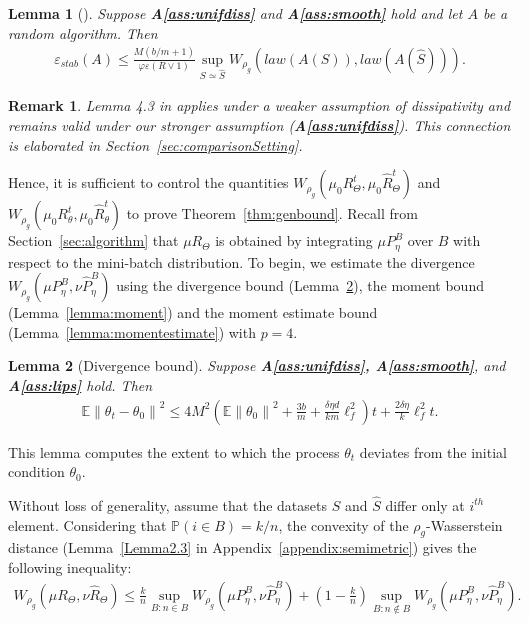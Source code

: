 \documentclass{article}
\newcommand{\norm}[1]{\left\lVert#1\right\rVert} %
\newtheorem{lemma}{Lemma}
\newtheorem{remark}{Remark}
\begin{document}
\begin{lemma}[{\cite[Lemma 4.3]{Farghly}}]\label{Lemmastab}
    Suppose \textbf{A\ref{ass:unifdiss}} and \textbf{A\ref{ass:smooth}} hold and let $A$ be a random algorithm. Then
    \begin{align*}
        \varepsilon_{stab} (A) \!\leq\! \frac{M (b/m \!+\!1)}{\varphi \varepsilon (R \vee 1)} \!\sup_{S \simeq \widehat{S}}\! W_{\rho_g} \!\!\left(law (A(S)), law(A(\widehat{S}))\!\right)\!.\!
    \end{align*}
\end{lemma}

\begin{remark}
    Lemma 4.3 in \citet{Farghly} applies under a weaker assumption of dissipativity and remains valid under our stronger assumption (\textbf{A\ref{ass:unifdiss}}). This connection is elaborated in Section~\ref{sec:comparisonSetting}.
\end{remark}

Hence, it is sufficient to control the quantities $W_{\rho_g}(\mu_0 R_\Theta^t, \mu_0 \widehat{R}_\Theta^t)$ and $W_{\rho_g}(\mu_0 R_\theta^t, \mu_0 \widehat{R}_\theta^t)$ to prove Theorem~\ref{thm:genbound}. Recall from Section~\ref{sec:algorithm} that $\mu R_\Theta$ is obtained by integrating $\mu P_\eta^B$ over $B$ with respect to the mini-batch distribution. To begin, we estimate the divergence $W_{\rho_g} (\mu P_\eta^B, \nu \widehat{P}_\eta^B)$ using the divergence bound (Lemma~\ref{lemma:divergence}), the moment bound (Lemma~\ref{lemma:moment}) and the moment estimate bound (Lemma~\ref{lemma:momentestimate}) with $p=4$.

\label{sec:divergence}
\begin{lemma}[Divergence bound]\label{lemma:divergence}
    Suppose \textbf{A\ref{ass:unifdiss}, A\ref{ass:smooth}}, and \textbf{A\ref{ass:lips}} hold. Then
    \begin{align*}
        \mathbb{E} \norm{\theta_t - \theta_0}^2 \!\leq\! 4M^2 \!\left(\!\mathbb{E}\norm{\theta_0}^2 \!+\!   \frac{3b}{m} \!+\!\frac{\delta \eta d}{k m} \ell_f^2 \!\right)\! t\!+\!\frac{2\delta \eta}{k} \ell_f^2 t.
    \end{align*}
\end{lemma}

This lemma computes the extent to which the process $\theta_t$ deviates from the initial condition $\theta_0$.

Without loss of generality, assume that the datasets $S$ and $\widehat{S}$ differ only at $i^{th}$ element. Considering that $\mathbb{P}(i \in B) = k/n$, the convexity of the $\rho_g$-Wasserstein distance (Lemma~\ref{Lemma2.3} in Appendix~\ref{appendix:semimetric}) gives the following inequality:
\begin{align*}
    W_{\rho_g} (\mu R_\Theta, \nu \widehat{R}_\Theta) \leq \frac{k}{n} \sup_{B: n \in B} W_{\rho_g} (\mu P_\eta^B, \nu \widehat{P}_\eta^B) + \left(1-\frac{k}{n}\right) \sup_{B: n \notin B} W_{\rho_g} (\mu P_\eta^B, \nu \widehat{P}_\eta^B).
\end{align*}
\end{document}
